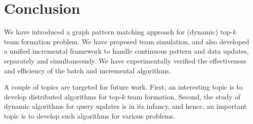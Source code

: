\vspace{-2ex}
\section{Conclusion}
\label{sec-conclusion}

We have introduced a graph pattern matching approach for (dynamic) top-$k$ team formation problem.
We have proposed team simulation,
and also  developed a unified incremental framework to handle continuous pattern and data updates, separately and simultaneously.
We have experimentally verified the effectiveness and efficiency of the batch and incremental algorithms.

A couple of topics are targeted for future work.  First, an interesting topic is to develop distributed algorithms for top-$k$ team formation.
Second, the study of dynamic algorithms for query updates is in its infancy,
and hence, an important topic is to develop such algorithms for various problems.

